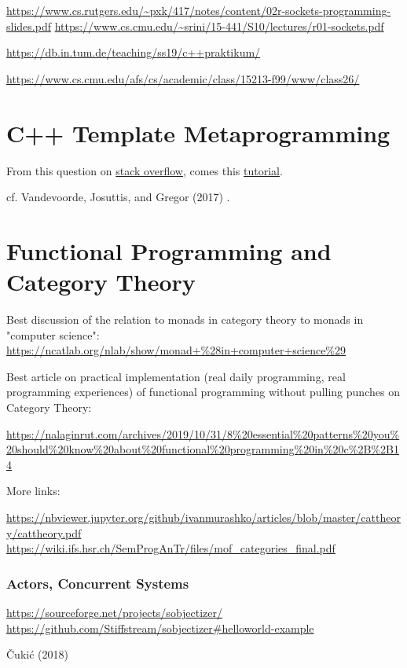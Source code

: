 \documentclass[10pt]{amsart}
\begin{document}
\url{https://www.cs.rutgers.edu/~pxk/417/notes/content/02r-sockets-programming-slides.pdf}
\url{https://www.cs.cmu.edu/~srini/15-441/S10/lectures/r01-sockets.pdf}

\url{https://db.in.tum.de/teaching/ss19/c++praktikum/}

\url{https://www.cs.cmu.edu/afs/cs/academic/class/15213-f99/www/class26/}




\part{C++ Template Metaprogramming}

From this question on \href{https://stackoverflow.com/questions/112277/best-introduction-to-c-template-metaprogramming}{stack overflow}, comes this \href{http://www.cs.rpi.edu/~musser/design/blitz/meta-art.html}{tutorial}. 

cf. Vandevoorde, Josuttis, and Gregor (2017) \cite{VJG2017}. 

\part{Functional Programming and Category Theory}

Best discussion of the relation to monads in category theory to monads in "computer science": \url{https://ncatlab.org/nlab/show/monad+%28in+computer+science%29}

Best article on practical implementation (real daily programming, real programming experiences) of functional programming without pulling punches on Category Theory:

\url{https://nalaginrut.com/archives/2019/10/31/8%20essential%20patterns%20you%20should%20know%20about%20functional%20programming%20in%20c%2B%2B14}

More links:

\url{https://nbviewer.jupyter.org/github/ivanmurashko/articles/blob/master/cattheory/cattheory.pdf}
\url{https://wiki.ifs.hsr.ch/SemProgAnTr/files/mof_categories_final.pdf}

\section{Actors, Concurrent Systems}

\url{https://sourceforge.net/projects/sobjectizer/}
\url{https://github.com/Stiffstream/sobjectizer#helloworld-example}

\v{C}uki\'{c} (2018) \cite{Cuki2018}
\end{document}
